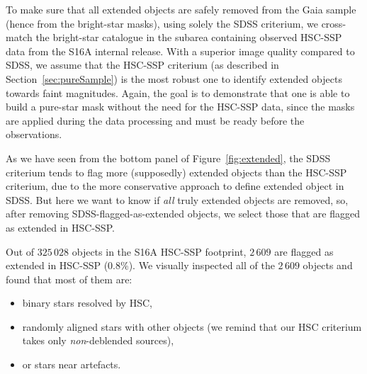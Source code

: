 \documentclass[11pt,a4paper,oneside,final]{scrartcl}
\begin{document}
To make sure that all extended objects are safely removed from the Gaia sample (hence from the bright-star masks), using solely the SDSS criterium, we cross-match the bright-star catalogue in the subarea containing observed HSC-SSP data from the S16A internal release. With a superior image quality compared to SDSS, we assume that the HSC-SSP criterium (as described in Section~\ref{sec:pureSample}) is the most robust one to identify extended objects towards faint magnitudes. Again, the goal is to demonstrate that one is able to build a pure-star mask without the need for the HSC-SSP data, since the masks are applied during the data processing and must be ready before the observations.

As we have seen from the bottom panel of Figure~\ref{fig:extended}, the SDSS criterium tends to flag more (supposedly) extended objects than the HSC-SSP criterium, due to the more conservative approach to define extended object in SDSS. But here we want to know if \emph{all} truly extended objects are  removed, so, after removing SDSS-flagged-as-extended objects, we select those that are flagged as extended in HSC-SSP.

Out of $325\,028$ objects in the S16A HSC-SSP footprint, $2\,609$ are flagged as extended in HSC-SSP (0.8\%). We visually inspected all of the $2\,609$ objects and found that most of them are:
\begin{itemize}
\item binary stars resolved by HSC,
\item randomly aligned stars with other objects (we remind that our HSC criterium takes only \emph{non}-deblended sources),
\item or stars near artefacts.
\end{itemize}
\end{document}

